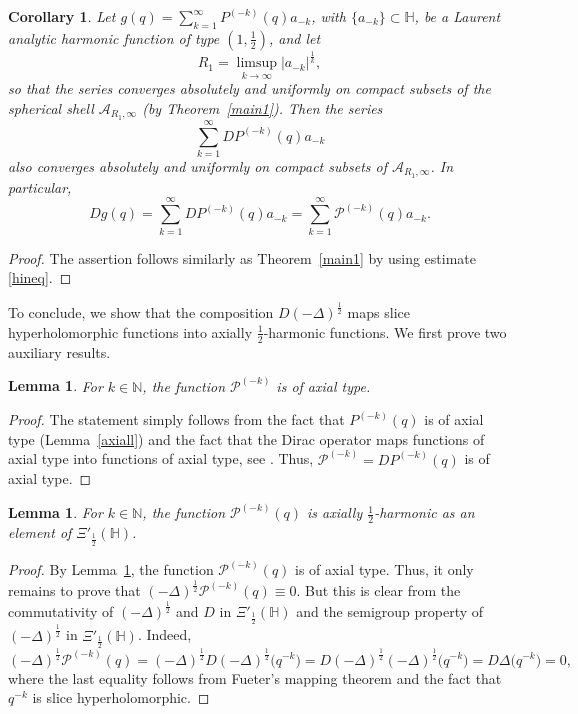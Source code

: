 \documentclass[reqno,11pt]{amsart}
\newtheorem{lemma}[theorem]{Lemma}
\newtheorem{corollary}[theorem]{Corollary}
\theoremstyle{definition}
\begin{document}
\begin{corollary}
	\label{CORconvergence12harmonic}
		Let $g(q) = \sum_{k=1}^{\infty }P^{(-k)}(q)a_{-k}$, with $ \{a_{-k}\} \subset \mathbb{H}$, be a Laurent analytic harmonic function of type $\left(1, \frac{1}{2}\right)$, and let
		\[
		R_1= \limsup_{k\to \infty} |a_{-k}|^\frac{1}{k},
		\]
		so that the series converges absolutely and uniformly  on compact subsets of the spherical shell $\mathcal{A}_{R_1,\infty}$ (by Theorem~\ref{main1}). Then the series
		\[
		\sum_{k=1}^\infty DP^{(-k)}(q) a_{-k}
		\]
		also converges absolutely and uniformly on compact subsets of $\mathcal{A}_{R_1,\infty}$.	In particular,
		\[
		Dg(q) = \sum_{k=1}^\infty DP^{(-k)}(q) a_{-k} = \sum_{k=1}^\infty \mathcal{P}^{(-k)} (q)a_{-k}.
		\]
\end{corollary}
\begin{proof}
The assertion follows similarly as Theorem~\ref{main1} by using estimate \eqref{hineq}.
\end{proof}


To conclude, we show that the composition $D(-\Delta)^\frac{1}{2}$ maps slice hyperholomorphic functions into axially $\frac{1}{2}$-harmonic functions. We first prove two auxiliary results.


\begin{lemma}\label{LEMaxialddelta}
	 For $k \in \mathbb{N}$, the function $ \mathcal{P}^{(-k)}$ is of axial type.
\end{lemma}
\begin{proof}
The statement simply follows from the fact that $P^{(-k)}(q)$ is of axial type (Lemma~\ref{axiall}) and the fact that the Dirac operator maps functions of axial type into functions of axial type, see \cite{Dixan, green}. Thus, $\mathcal{P}^{(-k)}= DP^{(-k)}(q)$ is of axial type.
\end{proof}

\begin{lemma}\label{lemaxiallyharmonic}
For $k \in \mathbb{N}$, the function $\mathcal{P}^{(-k)}(q)$ is axially $\frac{1}{2}$-harmonic as an element of $\Xi'_{\frac{1}{2}}(\mathbb{H})$.
\end{lemma}
\begin{proof}
By Lemma~\ref{LEMaxialddelta}, the function $\mathcal{P}^{(-k)}(q)$ is of axial type. Thus, it only remains to prove that $(-\Delta)^{\frac{1}{2}} \mathcal{P}^{(-k)}(q)\equiv 0$. But this is clear from the commutativity of $(-\Delta)^{\frac{1}{2}}$ and $D$ in $\Xi'_{\frac{1}{2}}(\mathbb{H})$ and the semigroup property of $(-\Delta)^{\frac{1}{2}}$ in $\Xi'_{\frac{1}{2}}(\mathbb{H})$. Indeed,
\[
(-\Delta)^{\frac{1}{2}} \mathcal{P}^{(-k)}(q) = (-\Delta)^{\frac{1}{2}} D(-\Delta)^{\frac{1}{2}} \big(q^{-k}\big)=D(-\Delta)^{\frac{1}{2}}(-\Delta)^{\frac{1}{2}}\big(q^{-k}\big)  =D\Delta\big(q^{-k}\big)=0,
\]
where the last equality follows from Fueter's mapping theorem and the fact that $q^{-k}$ is slice hyperholomorphic.
\end{proof}
\end{document}
